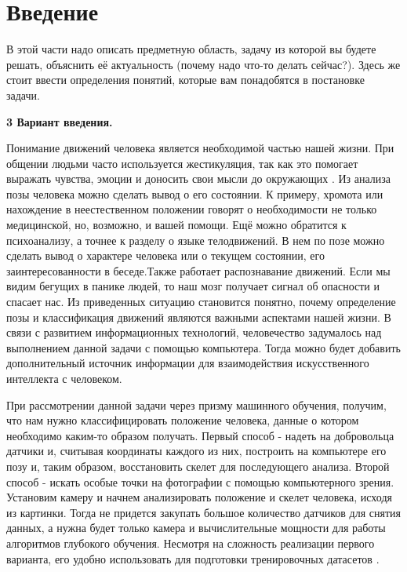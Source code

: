 \section{Введение}
\label{sec:Chapter0} 

В этой части надо описать предметную область, задачу из которой вы будете решать, объяснить её актуальность (почему надо что-то делать сейчас?).
Здесь же стоит ввести определения понятий, которые вам понадобятся в постановке задачи.

\hfill \break
\textbf{\Large 3 Вариант введения.}

Понимание движений человека является необходимой частью нашей жизни. При общении людьми часто используется жестикуляция, так как это помогает выражать чувства, эмоции и доносить свои мысли до окружающих . Из анализа позы человека можно сделать вывод о его состоянии. К примеру, хромота или нахождение в неестественном положении говорят о необходимости не только медицинской, но, возможно, и вашей помощи. Ещё можно обратится к психоанализу, а точнее к разделу о языке телодвижений. В нем по позе можно сделать вывод о характере человека или о текущем состоянии, его заинтересованности  в беседе.Также работает распознавание движений. Если мы видим бегущих в панике людей, то наш мозг получает сигнал об опасности и спасает нас. Из приведенных ситуацию   становится  понятно, почему определение позы и классификация движений являются важными аспектами нашей жизни. В связи с развитием информационных технологий, человечество задумалось над выполнением данной задачи с помощью компьютера. Тогда можно будет добавить дополнительный источник информации для  взаимодействия искусственного интеллекта с человеком.

При рассмотрении данной задачи через призму машинного обучения, получим, что нам нужно классифицировать положение человека, данные о котором необходимо каким-то образом получать. Первый способ - надеть на добровольца датчики и, считывая координаты каждого из них, построить на компьютере его позу и, таким образом, восстановить скелет для последующего анализа. Второй способ - искать особые точки на фотографии с помощью компьютерного зрения. Установим камеру и начнем анализировать положение и скелет человека, исходя из картинки. Тогда не придется закупать большое количество датчиков для снятия данных, а нужна будет только камера и вычислительные мощности для работы алгоритмов глубокого обучения. Несмотря на сложность реализации первого варианта, его удобно использовать для подготовки тренировочных датасетов \cite{h36m_pami}.

